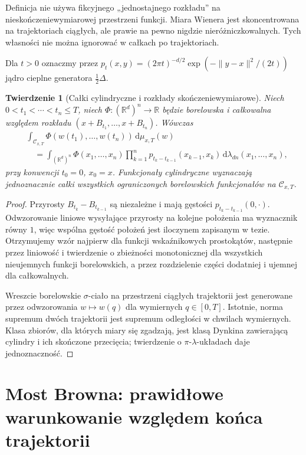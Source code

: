 \documentclass[11pt,a4paper,oneside]{report}
\numberwithin{equation}{chapter}
\theoremstyle{plain}
\newtheorem{twierdzenie}{Twierdzenie}[chapter]
\theoremstyle{definition}
\theoremstyle{remark}
\newcommand{\R}{\mathbb{R}}
\newcommand{\calC}{\mathcal{C}}
\newcommand{\dd}{\mathrm{d}}
\begin{document}
Definicja nie używa fikcyjnego „jednostajnego rozkładu” na
nieskończeniewymiarowej przestrzeni funkcji. Miara Wienera jest
skoncentrowana na trajektoriach ciągłych, ale prawie na pewno
nigdzie nieróżniczkowalnych. Tych własności nie można ignorować
w całkach po trajektoriach.

Dla $t>0$ oznaczmy przez
$p_t(x,y)=(2\pi t)^{-d/2}\exp(-\|y-x\|^2/(2t))$
jądro cieplne generatora $\frac12\Delta$.

\begin{twierdzenie}[Całki cylindryczne i rozkłady skończeniewymiarowe]
\label{th:path-cylinder}
Niech $0<t_1<\cdots<t_n\le T$, niech
$\Phi:(\R^d)^n\to\R$ będzie borelowska i całkowalna
względem rozkładu $(x+B_{t_1},\ldots,x+B_{t_n})$.
Wówczas
\[
\begin{split}
 &\int_{\calC_{x,T}}\Phi(w(t_1),\ldots,w(t_n))\,
       \dd\mu_{x,T}(w)\\
 &\quad=\int_{(\R^d)^n}\Phi(x_1,\ldots,x_n)
   \prod_{k=1}^n p_{t_k-t_{k-1}}(x_{k-1},x_k)
   \,\dd\lambda_{dn}(x_1,\ldots,x_n),
\end{split}
\]
przy konwencji $t_0=0$, $x_0=x$. Funkcjonały cylindryczne
wyznaczają jednoznacznie całki wszystkich ograniczonych
borelowskich funkcjonałów na $\calC_{x,T}$.
\end{twierdzenie}
\begin{proof}
Przyrosty $B_{t_k}-B_{t_{k-1}}$ są niezależne i mają gęstości
$p_{t_k-t_{k-1}}(0,\cdot)$. Odwzorowanie liniowe wysyłające
przyrosty na kolejne położenia ma wyznacznik równy $1$,
więc wspólna gęstość położeń jest iloczynem zapisanym w tezie.
Otrzymujemy wzór najpierw dla funkcji wskaźnikowych
prostokątów, następnie przez liniowość i twierdzenie o
zbieżności monotonicznej dla wszystkich nieujemnych
funkcji borelowskich, a przez rozdzielenie części dodatniej
i ujemnej dla całkowalnych.

Wreszcie borelowskie $\sigma$-ciało na przestrzeni
ciągłych trajektorii jest generowane przez odwzorowania
$w\mapsto w(q)$ dla wymiernych $q\in[0,T]$.
Istotnie, norma supremum dwóch trajektorii jest supremum
odległości w chwilach wymiernych. Klasa zbiorów, dla
których miary się zgadzają, jest klasą Dynkina zawierającą
cylindry i ich skończone przecięcia; twierdzenie o
$\pi$-$\lambda$-układach daje jednoznaczność.
\end{proof}

\section{Most Browna: prawidłowe warunkowanie względem końca trajektorii}
\end{document}
